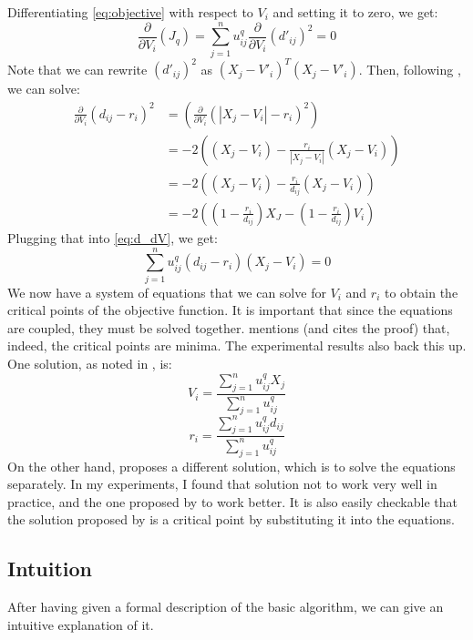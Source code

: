 \documentclass[conference]{IEEEtran}
\begin{document}
Differentiating \eqref{eq:objective} with respect to $V_i$ and setting it to zero, we get:
\begin{equation}\label{eq:d_dV}
\frac{\partial}{\partial V_i}(J_q) = \sum_{j=1}^{n} u_{ij}^q\frac{\partial}{\partial V_i} (d'_{ij})^2 = 0
\end{equation}
Note that we can rewrite $(d'_{ij})^2$ as $(X_j - V'_i)^T(X_j - V'_i)$.
Then, following \cite{308484}, we can solve:
\begin{equation}
\begin{aligned}
\frac{\partial}{\partial V_i} (d_{ij} - r_i)^2 &= \left(\frac{\partial}{\partial V_i} (|X_j - V_i| - r_i)^2\right) \\
&= -2 \left( (X_j - V_i) - \frac{r_i}{|X_j - V_i|} (X_j - V_i) \right) \\
&= -2 \left( (X_j - V_i) - \frac{r_i}{d_{ij}} (X_j - V_i) \right) \\
&= -2 \left( (1 - \frac{r_i}{d_{ij}})X_J - (1 - \frac{r_i}{d_{ij}})V_i \right)
\end{aligned}
\end{equation}
Plugging that into \eqref{eq:d_dV}, we get:
\begin{equation}
\sum_{j=1}^{n} u_{ij}^q (d_{ij} - r_i) (X_j - V_i) = 0
\end{equation}
We now have a system of equations that we can solve for $V_i$ and $r_i$ to obtain the critical points of the objective function. It is important that since
the equations are coupled, they must be solved together. \cite{DAVE1992713} mentions (and cites the proof) that, indeed, the critical
points are minima. The experimental results also back this up.
One solution, as noted in \cite{DAVE1992713}, is:
\begin{equation}
V_i = \frac{\sum_{j=1}^{n} u_{ij}^q X_j}{\sum_{j=1}^{n} u_{ij}^q}
\end{equation}
\begin{equation}\label{eq:r_i}
r_i = \frac{\sum_{j=1}^{n} u_{ij}^q d_{ij}}{\sum_{j=1}^{n} u_{ij}^q}
\end{equation}
On the other hand, \cite{308484} proposes a different solution, which is to solve the equations separately. In my experiments, I found that solution not to work very
well in practice, and the one proposed by \cite{DAVE1992713} to work better.
It is also easily checkable that the solution proposed by \cite{DAVE1992713} is a critical point by substituting it into the equations.


\subsection{Intuition}
After having given a formal description of the basic algorithm, we can give an intuitive explanation of it.
\end{document}
